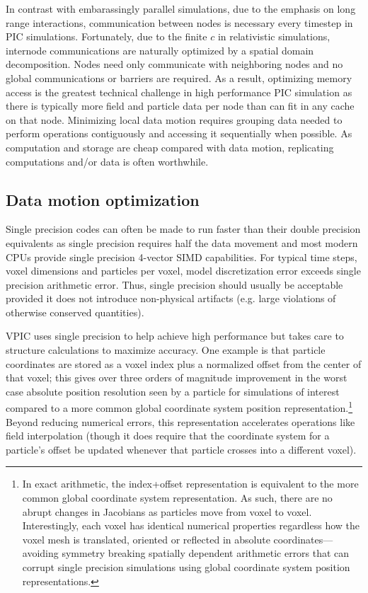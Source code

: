 \documentclass[journal,twoside]{IEEEtran}
\begin{document}
In contrast with embarassingly parallel simulations, due to the
emphasis on long range interactions, communication between nodes is
necessary every timestep in PIC simulations.  Fortunately, due to the
finite $c$ in relativistic simulations, internode communications are
naturally optimized by a spatial domain decomposition.  Nodes need
only communicate with neighboring nodes and no global communications
or barriers are required.  As a result, optimizing memory access is
the greatest technical challenge in high performance PIC simulation as
there is typically more field and particle data per node than can fit
in any cache on that node.  Minimizing local data motion requires
grouping data needed to perform operations contiguously and accessing
it sequentially when possible.  As computation and storage are cheap
compared with data motion, replicating computations and/or data is
often worthwhile.

\subsection{Data motion optimization}

Single precision codes can often be made to run faster than their
double precision equivalents as single precision requires half the
data movement and most modern CPUs provide single precision 4-vector
SIMD capabilities.  For typical time steps, voxel dimensions and
particles per voxel, model discretization error exceeds single
precision arithmetic error.  Thus, single precision should usually be
acceptable provided it does not introduce non-physical artifacts
(e.g. large violations of otherwise conserved quantities).

VPIC uses single precision to help achieve high performance but takes
care to structure calculations to maximize accuracy.  One example is
that particle coordinates are stored as a voxel index plus a
normalized offset from the center of that voxel; this gives over three
orders of magnitude improvement in the worst case absolute position
resolution seen by a particle for simulations of interest compared to
a more common global coordinate system position
representation.\footnote{In exact arithmetic, the index+offset
representation is equivalent to the more common global coordinate
system representation.  As such, there are no abrupt changes in
Jacobians as particles move from voxel to voxel.  Interestingly, each
voxel has identical numerical properties regardless how the voxel mesh
is translated, oriented or reflected in absolute
coordinates---avoiding symmetry breaking spatially dependent
arithmetic errors that can corrupt single precision simulations using
global coordinate system position representations.}  Beyond reducing
numerical errors, this representation accelerates operations like
field interpolation (though it does require that the coordinate system
for a particle's offset be updated whenever that particle crosses into
a different voxel).
\end{document}
